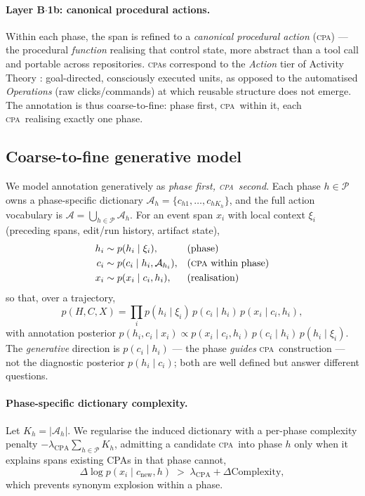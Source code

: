 \documentclass[11pt]{article}
\newcommand{\cpa}{\textsc{cpa}}
\begin{document}
\paragraph{Layer B$\cdot$1b: canonical procedural actions.}
Within each phase, the span is refined to a \emph{canonical procedural action} (\cpa) ---
the procedural \emph{function} realising that control state, more abstract than a tool call
and portable across repositories. \cpa s correspond to the \emph{Action} tier of Activity
Theory \cite{leontiev1978}: goal-directed, consciously executed units, as opposed to the
automatised \emph{Operations} (raw clicks/commands) at which reusable structure does not emerge.
The annotation is thus coarse-to-fine: phase first, \cpa\ within it, each \cpa\ realising
exactly one phase.

\subsection{Coarse-to-fine generative model}
\label{sec:generative}
We model annotation generatively as \emph{phase first, \cpa\ second}. Each phase
$h\in\mathcal P$ owns a phase-specific dictionary $\mathcal A_h=\{c_{h1},\dots,c_{hK_h}\}$, and the
full action vocabulary is $\mathcal A=\bigcup_{h\in\mathcal P}\mathcal A_h$. For an event span $x_i$
with local context $\xi_i$ (preceding spans, edit/run history, artifact state),
\begin{align}
h_i &\sim p(h_i\mid \xi_i), & &\text{(phase)}\\
c_i &\sim p(c_i\mid h_i,\mathcal A_{h_i}), & &\text{(\cpa\ within phase)}\\
x_i &\sim p(x_i\mid c_i,h_i), & &\text{(realisation)}
\end{align}
so that, over a trajectory,
\begin{equation}
p(H,C,X)=\prod_i p(h_i\mid \xi_i)\,p(c_i\mid h_i)\,p(x_i\mid c_i,h_i),
\label{eq:gen}
\end{equation}
with annotation posterior
$p(h_i,c_i\mid x_i)\propto p(x_i\mid c_i,h_i)\,p(c_i\mid h_i)\,p(h_i\mid \xi_i)$. The \emph{generative}
direction is $p(c_i\mid h_i)$ --- the phase \emph{guides} \cpa\ construction --- not the diagnostic
posterior $p(h_i\mid c_i)$; both are well defined but answer different questions.

\paragraph{Phase-specific dictionary complexity.}
Let $K_h=|\mathcal A_h|$. We regularise the induced dictionary with a per-phase complexity penalty
$-\lambda_{\mathrm{CPA}}\sum_{h\in\mathcal P}K_h$, admitting a candidate \cpa\ into phase $h$ only when
it explains spans existing CPAs in that phase cannot,
\begin{equation}
\Delta\log p(x_i\mid c_{\mathrm{new}},h)\;>\;\lambda_{\mathrm{CPA}}+\Delta\mathrm{Complexity},
\end{equation}
which prevents synonym explosion within a phase.
\end{document}
